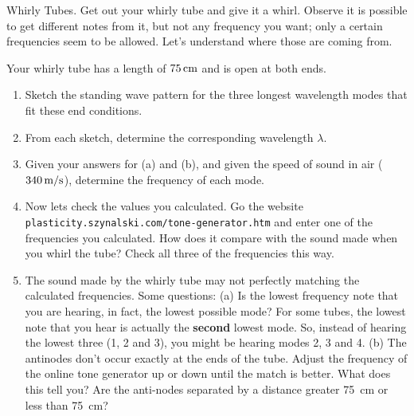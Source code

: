 \begin{aproblem}{Whirly Tubes.}  
  Get out your whirly tube and give it a whirl.  Observe it is
  possible to get different notes from it, but not any frequency you
  want; only a certain frequencies seem to be allowed.  Let's
  understand where those are coming from.
  \smallskip

  Your whirly tube has a length of $75\,\mbox{cm}$ and is open at both ends.
  \begin{enumerate}
  \item Sketch the standing wave pattern for the three longest
    wavelength modes that fit these end conditions.
  \item From each sketch, determine the corresponding wavelength
    $\lambda$.
  \item Given your answers for (a) and (b), and given the speed of
    sound in air ($340\,\mbox{m/s}$), determine the frequency of each
    mode.
  \item Now lets check the values you calculated.  Go the
    website\\ \texttt{plasticity.szynalski.com/tone-generator.htm} and
    enter one of the frequencies you calculated.  How does it compare
    with the sound made when you whirl the tube?  Check all three of
    the frequencies this way.
  \item The sound made by the whirly tube may not perfectly matching
    the calculated frequencies. Some questions: (a) Is the lowest
    frequency note that you are hearing, in fact, the lowest possible
    mode? For some tubes, the lowest note that you hear is actually
    the {\bf second} lowest mode. So, instead of hearing the lowest
    three (1, 2 and 3), you might be hearing modes 2, 3 and 4.  (b)
    The antinodes don't occur exactly at the ends of the tube.  Adjust
    the frequency of the online tone generator up or down until the
    match is better.  What does this tell you?  Are the anti-nodes
    separated by a distance greater 75~cm or less than 75~cm?
  \end{enumerate}
  \label{prob:whirly_tube}
\end{aproblem}
